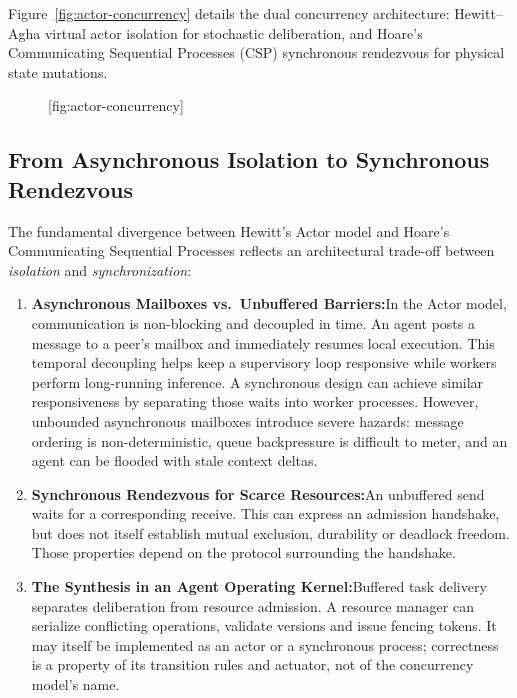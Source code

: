 Figure~\ref{fig:actor-concurrency} details the dual concurrency architecture: Hewitt--Agha virtual actor isolation for stochastic deliberation, and Hoare's Communicating Sequential Processes (CSP) synchronous rendezvous for physical state mutations.

\begin{figure}[tp]
  \centering
  [fig:actor-concurrency]
\end{figure}

\subsection{From Asynchronous Isolation to Synchronous Rendezvous}

The fundamental divergence between Hewitt's Actor model and Hoare's Communicating Sequential Processes reflects an architectural trade-off between \emph{isolation} and \emph{synchronization}:

\begin{enumerate}[leftmargin=1.8em,itemsep=3pt]
  \item \textbf{Asynchronous Mailboxes vs.\ Unbuffered Barriers:}\enspace In the Actor model, communication is non-blocking and decoupled in time. An agent posts a message to a peer's mailbox and immediately resumes local execution. This temporal decoupling helps keep a supervisory loop responsive while workers perform long-running inference. A synchronous design can achieve similar responsiveness by separating those waits into worker processes. However, unbounded asynchronous mailboxes introduce severe hazards: message ordering is non-deterministic, queue backpressure is difficult to meter, and an agent can be flooded with stale context deltas.
  
  \item \textbf{Synchronous Rendezvous for Scarce Resources:}\enspace An unbuffered send waits for a corresponding receive. This can express an admission handshake, but does not itself establish mutual exclusion, durability or deadlock freedom. Those properties depend on the protocol surrounding the handshake.

  \item \textbf{The Synthesis in an Agent Operating Kernel:}\enspace Buffered task delivery separates deliberation from resource admission. A resource manager can serialize conflicting operations, validate versions and issue fencing tokens. It may itself be implemented as an actor or a synchronous process; correctness is a property of its transition rules and actuator, not of the concurrency model's name.
\end{enumerate}

